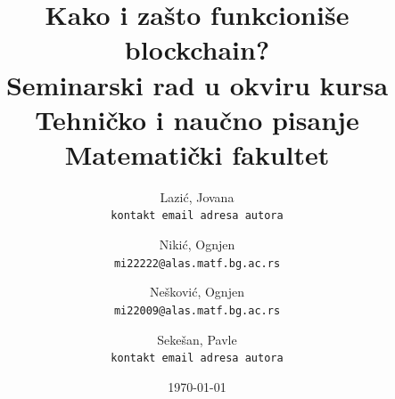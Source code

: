 \documentclass[a4paper]{article}
\begin{document}
\title{Kako i zašto funkcioniše blockchain?\\ \small{Seminarski rad u okviru kursa\\Tehničko i naučno pisanje\\ Matematički fakultet}}
\author{
    Lazić, Jovana\\ 
    \texttt{kontakt email adresa autora}
    \and
    Nikić, Ognjen\\ 
    \texttt{mi22222@alas.matf.bg.ac.rs}
    \and
    Nešković, Ognjen\\ 
    \texttt{mi22009@alas.matf.bg.ac.rs}
    \and
    Sekešan, Pavle\\ 
    \texttt{kontakt email adresa autora}
}
\date{\today}
\maketitle
\end{document}
